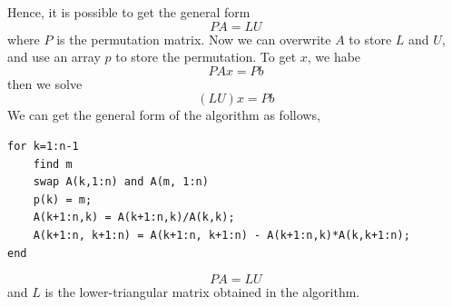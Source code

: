 Hence, it is possible to get the general form \[
    PA = LU
\]
where $P$ is the permutation matrix. Now we can overwrite $A$ to store $L$ and $U$, and use an array $p$ to store the permutation. To get $x$, we habe \[
    PAx = Pb
\]
then we solve \[
    (LU)x = Pb
\]
We can get the general form of the algorithm as follows,
\begin{verbatim}
for k=1:n-1
    find m
    swap A(k,1:n) and A(m, 1:n)
    p(k) = m;
    A(k+1:n,k) = A(k+1:n,k)/A(k,k);
    A(k+1:n, k+1:n) = A(k+1:n, k+1:n) - A(k+1:n,k)*A(k,k+1:n);
end
\end{verbatim}

\begin{theorem}
    \[
        PA = LU
    \]
    and $L$ is the lower-triangular matrix obtained in the algorithm.
\end{theorem}

